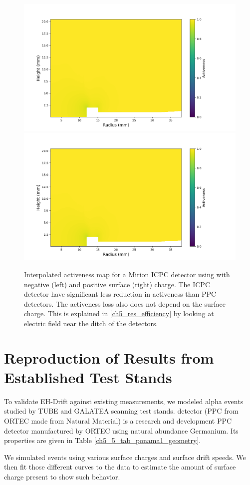 \begin{figure}%
\centering
\includegraphics[trim={1.5cm 0cm 3.3cm 1cm},clip,width=0.49\linewidth]{ch5/figs/activeness_map_cubic_sc=-0.3_V07647A_2039.png}
\includegraphics[trim={1.5cm 0cm 3.3cm 1cm},clip,width=0.49\linewidth]{ch5/figs/activeness_map_cubic_sc=0.3_V07647A_2039.png}
\caption{Interpolated activeness map for a Mirion ICPC detector using \ehd with negative (left) and positive surface (right) charge. The ICPC detector have significant less reduction in activeness than PPC detectors. The activeness loss also does not depend on the surface charge. This is explained in \ref{ch5_res_efficiency} by looking at electric field near the ditch of the detectors.}
\label{ch5_fig_interpolated_icpc_activeness_map}
\end{figure}


\section{\label{res:1} Reproduction of Results from Established Test Stands}

To validate EH-Drift against existing measurements, we modeled alpha events studied by TUBE and GALATEA scanning test stands. {\ponama} detector (PPC from ORTEC made from Natural Material) is a research and development PPC detector manufactured by ORTEC using natural abundance Germanium. Its properties are given in Table \ref{ch5_5_tab_ponama1_geometry}.



We simulated events using various surface charges and surface drift speeds.  We then fit those different curves to the data to estimate the amount of surface charge present to show such behavior.


